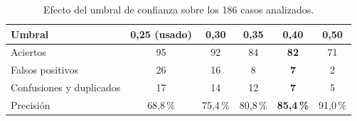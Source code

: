 \documentclass[10pt,a4paper]{article}
\begin{document}
\begin{table}[H]
\centering\footnotesize
\caption{Efecto del umbral de confianza sobre los 186 casos analizados.}
\label{tab:umbral}
\begin{tabular}{@{}lccccc@{}}
\toprule
\textbf{Umbral} & \textbf{0{,}25 (usado)} & \textbf{0{,}30} & \textbf{0{,}35} & \textbf{0{,}40} & \textbf{0{,}50}\\
\midrule
Aciertos          & 95 & 92 & 84 & \textbf{82} & 71\\
Falsos positivos  & 26 & 16 &  8 & \textbf{7}  &  2\\
Confusiones y duplicados & 17 & 14 & 12 & \textbf{7} & 5\\
Precisión         & 68{,}8\,\% & 75{,}4\,\% & 80{,}8\,\% & \textbf{85{,}4\,\%} & 91{,}0\,\%\\
\bottomrule
\end{tabular}
\end{table}
\end{document}
